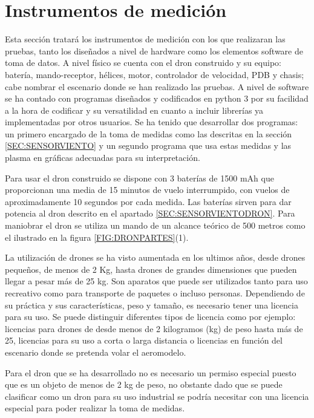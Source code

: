 
\section{Instrumentos de medición\label{SEC:INSTR}}
Esta sección tratará los instrumentos de medición con los que realizaran las pruebas, tanto los diseñados a nivel de hardware como los elementos software de toma de datos. 
A nivel físico se cuenta con el dron construido y su equipo: batería, mando-receptor, hélices, motor, controlador de velocidad, PDB y chasis; cabe nombrar el escenario donde se han realizado las pruebas. A nivel de software se ha contado con programas diseñados y codificados en python 3 por su facilidad a la hora de codificar y su versatilidad en cuanto a incluir librerías ya implementadas por otros usuarios. Se ha tenido que desarrollar dos programas: un primero encargado de la toma de medidas como las descritas en la sección \ref{SEC:SENSORVIENTO} y un segundo programa que usa estas medidas y las plasma en gráficas adecuadas para su interpretación.


Para usar el dron construido se dispone con 3 baterías de 1500 mAh que proporcionan una media de 15 minutos de vuelo interrumpido, con vuelos de aproximadamente 10 segundos por cada medida.
Las baterías sirven para dar potencia al dron descrito en el apartado \ref{SEC:SENSORVIENTODRON}. Para maniobrar el dron se utiliza un mando de un alcance teórico de 500 metros como el ilustrado en la figura \ref{FIG:DRONPARTES}(1).

La utilización de drones se ha visto aumentada en los ultimos años, desde drones pequeños, de menos de 2 Kg, hasta drones de grandes dimensiones que pueden llegar a pesar más de 25 kg. Son aparatos que puede ser utilizados tanto para uso recreativo como para transporte de paquetes o incluso personas. Dependiendo de su práctica y sus características, peso y tamaño, es necesario tener una licencia para su uso. Se puede distinguir diferentes tipos de licencia como por ejemplo: licencias para drones de desde menos de 2 kilogramos (kg) de peso hasta más de 25, licencias para su uso a corta o larga distancia o licencias en función del escenario donde se pretenda volar el aeromodelo.

Para el dron que se ha desarrollado no es necesario un permiso especial puesto que es un objeto de menos de 2 kg de peso, no obstante dado que se puede clasificar como un dron para su uso industrial se podría necesitar con una licencia especial para poder realizar la toma de medidas.

